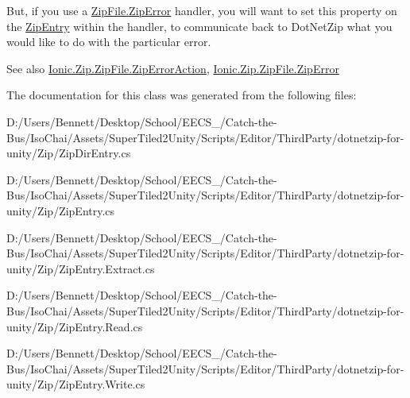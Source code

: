 But, if you use a \mbox{\hyperlink{class_super_tiled2_unity_1_1_ionic_1_1_zip_1_1_zip_file_a9c72461567386905e4e52ccb312e4812}{Zip\+File.\+Zip\+Error}} handler, you will want to set this property on the {\ttfamily \mbox{\hyperlink{class_super_tiled2_unity_1_1_ionic_1_1_zip_1_1_zip_entry}{Zip\+Entry}}} within the handler, to communicate back to Dot\+Net\+Zip what you would like to do with the particular error. 

\begin{DoxySeeAlso}{See also}
\mbox{\hyperlink{class_super_tiled2_unity_1_1_ionic_1_1_zip_1_1_zip_file_a68ea59eb815f14ecc6f060da3a77e5a6}{Ionic.\+Zip.\+Zip\+File.\+Zip\+Error\+Action}}, \mbox{\hyperlink{class_super_tiled2_unity_1_1_ionic_1_1_zip_1_1_zip_file_a9c72461567386905e4e52ccb312e4812}{Ionic.\+Zip.\+Zip\+File.\+Zip\+Error}}


\end{DoxySeeAlso}


The documentation for this class was generated from the following files\+:\begin{DoxyCompactItemize}
\item 
D\+:/\+Users/\+Bennett/\+Desktop/\+School/\+E\+E\+C\+S\+\_/\+Catch-\/the-\/\+Bus/\+Iso\+Chai/\+Assets/\+Super\+Tiled2\+Unity/\+Scripts/\+Editor/\+Third\+Party/dotnetzip-\/for-\/unity/\+Zip/Zip\+Dir\+Entry.\+cs\item 
D\+:/\+Users/\+Bennett/\+Desktop/\+School/\+E\+E\+C\+S\+\_/\+Catch-\/the-\/\+Bus/\+Iso\+Chai/\+Assets/\+Super\+Tiled2\+Unity/\+Scripts/\+Editor/\+Third\+Party/dotnetzip-\/for-\/unity/\+Zip/Zip\+Entry.\+cs\item 
D\+:/\+Users/\+Bennett/\+Desktop/\+School/\+E\+E\+C\+S\+\_/\+Catch-\/the-\/\+Bus/\+Iso\+Chai/\+Assets/\+Super\+Tiled2\+Unity/\+Scripts/\+Editor/\+Third\+Party/dotnetzip-\/for-\/unity/\+Zip/Zip\+Entry.\+Extract.\+cs\item 
D\+:/\+Users/\+Bennett/\+Desktop/\+School/\+E\+E\+C\+S\+\_/\+Catch-\/the-\/\+Bus/\+Iso\+Chai/\+Assets/\+Super\+Tiled2\+Unity/\+Scripts/\+Editor/\+Third\+Party/dotnetzip-\/for-\/unity/\+Zip/Zip\+Entry.\+Read.\+cs\item 
D\+:/\+Users/\+Bennett/\+Desktop/\+School/\+E\+E\+C\+S\+\_/\+Catch-\/the-\/\+Bus/\+Iso\+Chai/\+Assets/\+Super\+Tiled2\+Unity/\+Scripts/\+Editor/\+Third\+Party/dotnetzip-\/for-\/unity/\+Zip/Zip\+Entry.\+Write.\+cs\end{DoxyCompactItemize}
